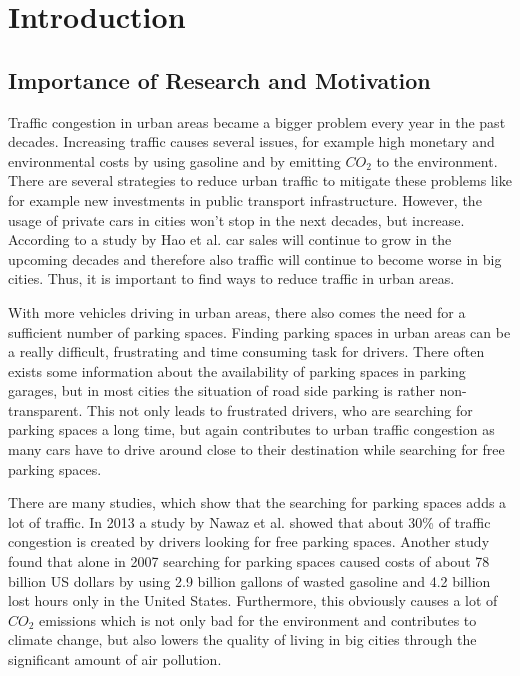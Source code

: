 \chapter{Introduction}
\label{sec:introduction}




\section{Importance of Research and Motivation}
Traffic congestion in urban areas became a bigger problem every year in the past decades. Increasing traffic causes several issues, for example high monetary and environmental costs by using gasoline and by emitting $CO_2$ to the environment. There are several strategies to reduce urban traffic to mitigate these problems like for example new investments in public transport infrastructure. However, the usage of private cars in cities won't stop in the next decades, but increase. According to a study by Hao et al. \cite{HAO2016121} car sales will continue to grow in the upcoming decades and therefore also traffic will continue to become worse in big cities. Thus, it is important to find ways to reduce traffic in urban areas.

With more vehicles driving in urban areas, there also comes the need for a sufficient number of parking spaces. Finding parking spaces in urban areas can be a really difficult, frustrating and time consuming task for drivers. There often exists some information about the availability of parking spaces in parking garages, but in most cities the situation of road side parking is rather non-transparent. This not only leads to frustrated drivers, who are searching for parking spaces a long time, but again contributes to urban traffic congestion as many cars have to drive around close to their destination while searching for free parking spaces. 

There are many studies, which show that the searching for parking spaces adds a lot of traffic. In 2013 a study by Nawaz et al. \cite{Nawaz:2013:PSB:2500423.2500438} showed that about 30\% of traffic congestion is created by drivers looking for free parking spaces. Another study \cite{TexasMobilityReport} found that alone in 2007 searching for parking spaces caused costs of about 78 billion US dollars by using 2.9 billion gallons of wasted gasoline and 4.2 billion lost hours only in the United States. Furthermore, this obviously causes a lot of $CO_2$ emissions which is not only bad for the environment and contributes to climate change, but also lowers the quality of living in big cities through the significant amount of air pollution.

